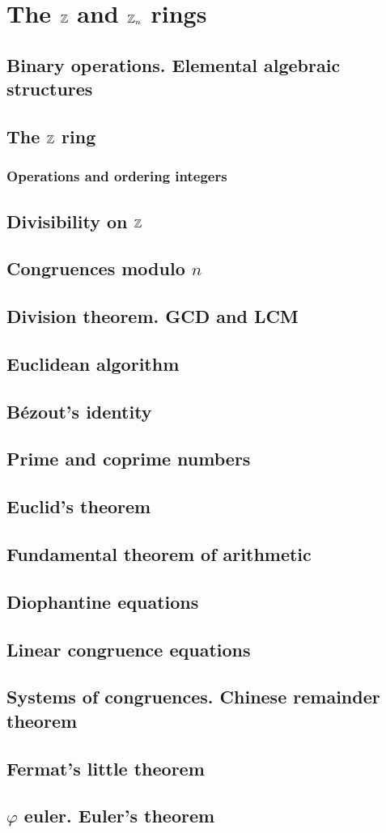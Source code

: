 \chapter{The $\Z$ and $\Z_n$ rings}
\thispagestyle{noheaders}

\section{Binary operations. Elemental algebraic structures}
\section{The $\Z$ ring}
\subsection{Operations and ordering integers}
\section{Divisibility on $\Z$}
\section{Congruences modulo $n$}
\section{Division theorem. GCD and LCM}
\section{Euclidean algorithm}
\section{Bézout's identity}
\section{Prime and coprime numbers}
\section{Euclid's theorem}
\section{Fundamental theorem of arithmetic}
\section{Diophantine equations}
\section{Linear congruence equations}
\section{Systems of congruences. Chinese remainder theorem}
\section{Fermat's little theorem}
\section{$\varphi$ euler. Euler's theorem}
